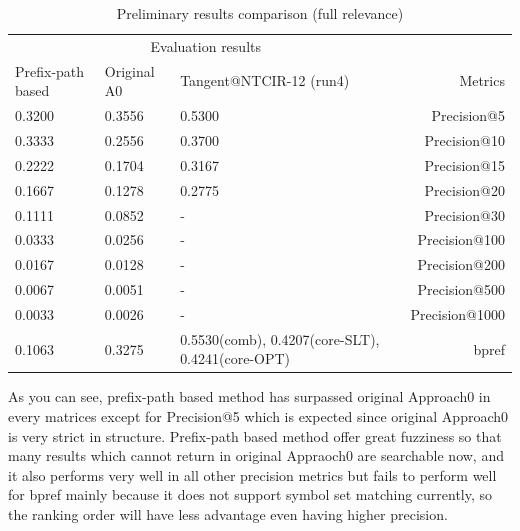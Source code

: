 \documentclass[a4paper]{article}
\begin{document}
\begin{table}
\begin{center}
\begin{tabular}{lllr}
\hline
\multicolumn{3}{c}{Evaluation results} \\
\cline{1-3}
Prefix-path based & Original A0 & Tangent@NTCIR-12 (run4) & Metrics \\
\hline
0.3200            & 0.3556      & 0.5300   & Precision@5    \\
0.3333            & 0.2556      & 0.3700   & Precision@10    \\
0.2222            & 0.1704      & 0.3167   & Precision@15   \\
0.1667            & 0.1278      & 0.2775   & Precision@20    \\
0.1111            & 0.0852      & -        & Precision@30   \\
0.0333            & 0.0256      & -        & Precision@100   \\
0.0167            & 0.0128      & -        & Precision@200   \\
0.0067            & 0.0051      & -        & Precision@500   \\
0.0033            & 0.0026      & -        & Precision@1000  \\
0.1063            & 0.3275      & 0.5530(comb), 0.4207(core-SLT), 0.4241(core-OPT) & bpref   \\
\hline
\end{tabular}
\caption{\label{tab:frog}Preliminary results comparison (full relevance) \cite{Davila2016Tangent3AT, DavilaSigir}}
\end{center}
\end{table}

As you can see, prefix-path based method has surpassed original Approach0 in every matrices except for Precision@5 which is expected since original Approach0 is very strict in structure. Prefix-path based method offer great fuzziness so that many results which cannot return in original Appraoch0 are searchable now, and it also performs very well in all other precision metrics but fails to perform well for bpref mainly because it does not support symbol set matching currently, so the ranking order will have less advantage even having higher precision.



\end{document}
